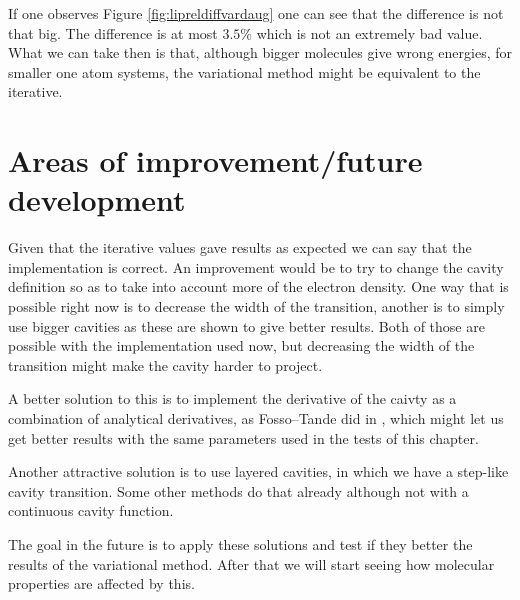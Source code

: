 \documentclass[../master_thesis.tex]{subfiles}
\begin{document}
If one observes Figure \ref{fig:lipreldiffvardaug} one can see that the difference is not
that big. The difference is at most $3.5\%$ which is not an extremely bad value.
What we can take then is that, although bigger molecules give wrong energies, for smaller
one atom systems, the variational method might be equivalent to the iterative.

\section{Areas of improvement/future development}
Given that the iterative values gave results as expected we can say that the
implementation is correct. An improvement would be to try to change the cavity
definition so as to take into account more of the electron density. One way that is
possible right now is to decrease the width of the transition, another is to simply use
bigger cavities as these are shown to give better results. Both of those are possible
with the implementation used now, but decreasing the width of the transition might
make the cavity harder to project.

A better solution to this is to implement the derivative of the caivty as
a combination of analytical derivatives, as Fosso--Tande did in \cite{FossoTande:2013ka}, which
might let us get better results with the same parameters used in the tests of this chapter.

Another attractive solution is to use layered cavities, in which we have a step-like
cavity transition. Some other methods do that already \cite{Tomasi:2005ipa} although
not with a continuous cavity function.

The goal in the future is to apply these solutions and test if they better the
results of the variational method. After that we will start seeing how molecular properties
are affected by this.




\biblio
\end{document}
